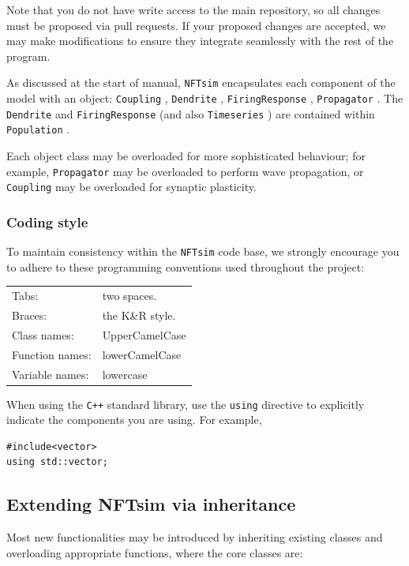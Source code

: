 \documentclass[12pt,a4paper]{article}
\newcommand{\type}[1]{{\small\small\tt #1} }
\newcommand{\NF}[0]{\type{NFTsim}}
\begin{document}
Note that you do not have write access to the main repository, so all changes must be proposed via pull requests. If your proposed changes are accepted, we may make modifications to ensure they integrate seamlessly with the rest of the program.

As discussed at the start of manual, \NF encapsulates each component of the model with an object: \type{Coupling}, \type{Dendrite}, \type{FiringResponse}, \type{Propagator}. The \type{Dendrite} and \type{FiringResponse} (and also \type{Timeseries}) are contained within \type{Population}.

Each object class may be overloaded for more sophisticated behaviour; for example, \type{Propagator} may be overloaded to perform wave propagation, or \type{Coupling} may be overloaded for synaptic plasticity.

\subsubsection{Coding style}

To maintain consistency within the \NF code base, we strongly encourage you to adhere to these programming conventions used throughout the project:

\begin{tabular}{ l l }
    Tabs:& two spaces.\\
    Braces:& the K\&R style.\\
    Class names:&UpperCamelCase\\
    Function names:&lowerCamelCase\\
    Variable names:&lowercase
\end{tabular}

When using the \type{C++} standard library, use the \type{using} directive to explicitly indicate the components you are using. For example,

\begin{lstlisting}
#include<vector>
using std::vector;
\end{lstlisting}

\subsection{Extending NFTsim via inheritance}
\label{sec:extension}

Most new functionalities may be introduced by inheriting existing classes and overloading appropriate functions, where the core classes are:
\end{document}
